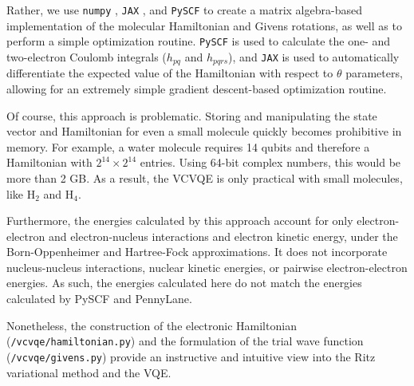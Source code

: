 \documentclass[11pt]{article}
\begin{document}
    Rather, we use \texttt{numpy} \cite{numpy}, \texttt{JAX} \cite{JAX}, and \texttt{PySCF} \cite{PySCF} to create a matrix algebra-based implementation of the molecular Hamiltonian and Givens rotations, as well as to perform a simple optimization routine. \texttt{PySCF} is used to calculate the one- and two-electron Coulomb integrals ($h_{pq}$ and $h_{pqrs}$), and \texttt{JAX} is used to automatically differentiate the expected value of the Hamiltonian with respect to $\theta$ parameters, allowing for an extremely simple gradient descent-based optimization routine. 

    Of course, this approach is problematic. Storing and manipulating the state vector and Hamiltonian for even a small molecule quickly becomes prohibitive in memory. For example, a water molecule requires 14 qubits and therefore a Hamiltonian with $2^{14} \times 2^{14}$ entries. Using 64-bit complex numbers, this would be more than 2 GB. As a result, the VCVQE is only practical with small molecules, like H$_2$ and H$_4$.

    Furthermore, the energies calculated by this approach account for only electron-electron and electron-nucleus interactions and electron kinetic energy, under the Born-Oppenheimer and Hartree-Fock approximations. It does not incorporate nucleus-nucleus interactions, nuclear kinetic energies, or pairwise electron-electron energies. As such, the energies calculated here do not match the energies calculated by PySCF and PennyLane.

    Nonetheless, the construction of the electronic Hamiltonian (\texttt{/vcvqe/hamiltonian.py}) and the formulation of the trial wave function (\texttt{/vcvqe/givens.py}) provide an instructive and intuitive view into the Ritz variational method and the VQE.


\newpage
\printbibliography 
\end{document}
